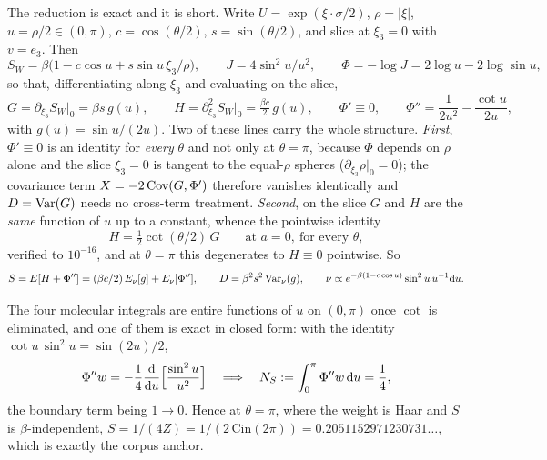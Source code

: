 The reduction is exact and it is short. Write $U=\exp(\xi\cdot\sigma/2)$, $\rho=|\xi|$,
$u=\rho/2\in(0,\pi)$, $c=\cos(\theta/2)$, $s=\sin(\theta/2)$, and slice at $\xi_3=0$ with
$v=e_3$. Then
\begin{equation}
S_W=\beta\bigl(1-c\cos u+s\sin u\,\xi_3/\rho\bigr),\qquad
J=4\sin^{2}u/u^{2},\qquad
\Phi=-\log J=2\log u-2\log\sin u ,
\end{equation}
so that, differentiating along $\xi_3$ and evaluating on the slice,
\begin{equation}
G=\partial_{\xi_3}S_W\big|_0=\beta s\,g(u),\qquad
H=\partial^{2}_{\xi_3}S_W\big|_0=\tfrac{\beta c}{2}\,g(u),\qquad
\Phi'\equiv0,\qquad
\Phi''=\frac{1}{2u^{2}}-\frac{\cot u}{2u},
\label{eq:derivs5}
\end{equation}
with $g(u)=\sin u/(2u)$. Two of these lines carry the whole structure. \emph{First},
$\Phi'\equiv0$ is an identity for \emph{every} $\theta$ and not only at $\theta=\pi$, because
$\Phi$ depends on $\rho$ alone and the slice $\xi_3=0$ is tangent to the equal-$\rho$ spheres
($\partial_{\xi_3}\rho|_{0}=0$); the covariance term $X=-2\operatorname{Cov}(G,\Phi')$ therefore vanishes
identically and $D=\operatorname{Var}(G)$ needs no cross-term treatment. \LT{} \emph{Second}, on the slice $G$
and $H$ are the \emph{same} function of $u$ up to a constant, whence the pointwise identity
\begin{equation}
H=\tfrac12\cot(\theta/2)\,G\qquad\text{at }a=0,\ \text{for every }\theta,
\label{eq:halfcot5}
\end{equation}
verified to $10^{-16}$, and at $\theta=\pi$ this degenerates to $H\equiv0$ pointwise. \LT{} So
\begin{equation}
S=E[H+\Phi'']=(\beta c/2)\,E_\nu[g]+E_\nu[\Phi''],\qquad
D=\beta^{2}s^{2}\operatorname{Var}_\nu(g),\qquad
\nu\propto e^{-\beta(1-c\cos u)}\sin^{2}u\,u^{-1}\mathrm{d}u .
\label{eq:SD5}
\end{equation}

The four molecular integrals are entire functions of $u$ on $(0,\pi)$ once $\cot$ is eliminated,
and one of them is exact in closed form: with the identity $\cot u\,\sin^{2}u=\sin(2u)/2$,
\begin{equation}
\Phi''w=-\frac14\frac{\mathrm{d}}{\mathrm{d}u}\Bigl[\frac{\sin^{2}u}{u^{2}}\Bigr]
\quad\Longrightarrow\quad
N_S:=\int_0^{\pi}\Phi''w\,\mathrm{d}u=\frac14 ,
\label{eq:ibp5}
\end{equation}
the boundary term being $1\to0$. Hence at $\theta=\pi$, where the weight is Haar and $S$ is
$\beta$-independent, $S=1/(4Z)=1/(2\,\mathrm{Cin}(2\pi))=0.2051152971230731\ldots$, which is
exactly the corpus anchor. \LT{}

